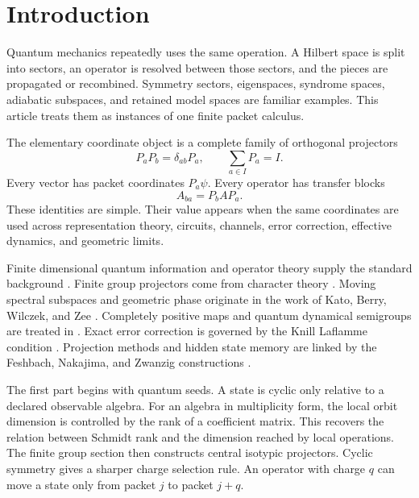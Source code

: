 \section{Introduction}\label{strong:section:001}\label{strong:sec:introduction}

Quantum mechanics repeatedly uses the same operation. A Hilbert space is split into sectors, an operator is resolved between those sectors, and the pieces are propagated or recombined. Symmetry sectors, eigenspaces, syndrome spaces, adiabatic subspaces, and retained model spaces are familiar examples. This article treats them as instances of one finite packet calculus.

The elementary coordinate object is a complete family of orthogonal projectors
\[
P_aP_b=\delta_{ab}P_a,
\qquad
\sum_{a\in I}P_a=I.
\]
Every vector has packet coordinates \(P_a\psi\). Every operator has transfer blocks
\[
A_{ba}=P_bAP_a.
\]
These identities are simple. Their value appears when the same coordinates are used across representation theory, circuits, channels, error correction, effective dynamics, and geometric limits.

Finite dimensional quantum information and operator theory supply the standard background \cite{NielsenChuang2010,Watrous2018,Bhatia1997}. Finite group projectors come from character theory \cite{Serre1977,FultonHarris1991}. Moving spectral subspaces and geometric phase originate in the work of Kato, Berry, Wilczek, and Zee \cite{Kato1950,Kato1995,Berry1984,WilczekZee1984}. Completely positive maps and quantum dynamical semigroups are treated in \cite{Stinespring1955,Choi1975,Kraus1983,Lindblad1976}. Exact error correction is governed by the Knill Laflamme condition \cite{KnillLaflamme1997,SchumacherNielsen1996,BenyKempfKribs2007}. Projection methods and hidden state memory are linked by the Feshbach, Nakajima, and Zwanzig constructions \cite{Feshbach1958,Nakajima1958,Zwanzig1960,BravyiDiVincenzoLoss2011}.

The first part begins with quantum seeds. A state is cyclic only relative to a declared observable algebra. For an algebra in multiplicity form, the local orbit dimension is controlled by the rank of a coefficient matrix. This recovers the relation between Schmidt rank and the dimension reached by local operations. The finite group section then constructs central isotypic projectors. Cyclic symmetry gives a sharper charge selection rule. An operator with charge \(q\) can move a state only from packet \(j\) to packet \(j+q\).

